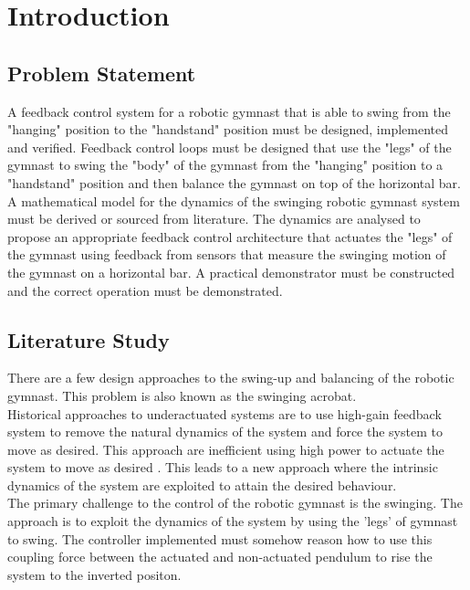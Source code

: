 \chapter{Introduction}
\label{chp:intro}


\section{Problem Statement}

A feedback control system for a robotic gymnast that is able to swing from the "hanging" position to the "handstand" position must be designed, implemented and verified. Feedback control loops must be designed that use the "legs" of the gymnast to swing the "body" of the gymnast from the "hanging" position to a "handstand" position and then balance the gymnast on top of the horizontal bar. A mathematical model for the dynamics of the swinging robotic gymnast system must be derived or sourced from literature. The dynamics are analysed to propose an appropriate feedback control architecture that actuates the "legs" of the gymnast using feedback from sensors that measure the swinging motion of the gymnast on a horizontal bar. A practical demonstrator must be constructed and the correct operation must be demonstrated.\\


\section{Literature Study}
There are a few design approaches to the swing-up and balancing of the robotic gymnast. This problem is also known as the swinging acrobat. \\

Historical approaches to underactuated systems are to use high-gain feedback system to remove the natural dynamics of the system and force the system to move as desired. This approach are inefficient using high power to actuate the system to move as desired \citep{tedrake}. This leads to a new approach where the intrinsic dynamics of the system are exploited to attain the desired behaviour.\\

The primary challenge to the control of the robotic gymnast is the swinging. The approach is to exploit the dynamics of the system by using the 'legs' of gymnast to swing. The controller implemented must somehow reason how to use this coupling force between the actuated and non-actuated pendulum to rise the system to the inverted positon.\\

